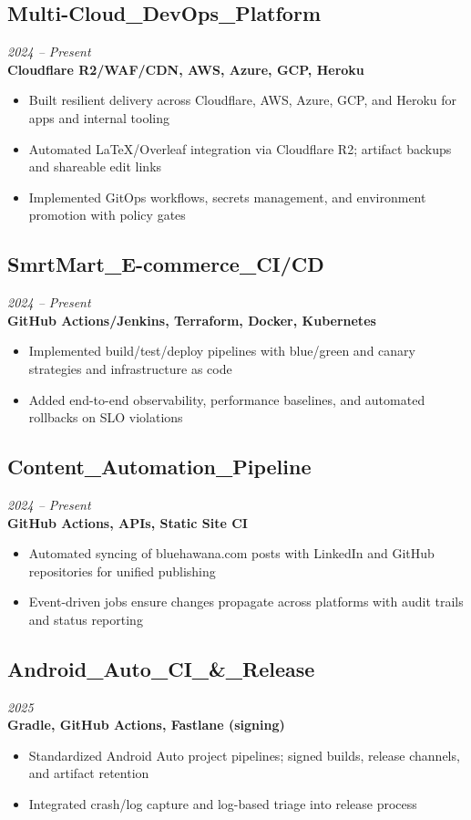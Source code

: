 \documentclass[11pt,a4paper]{article}
\begin{document}
\subsection{Multi-Cloud\_DevOps\_Platform}
\textit{2024 -- Present} \\
\textbf{Cloudflare R2/WAF/CDN, AWS, Azure, GCP, Heroku}
\begin{itemize}
\item Built resilient delivery across Cloudflare, AWS, Azure, GCP, and Heroku for apps and internal tooling
\item Automated LaTeX/Overleaf integration via Cloudflare R2; artifact backups and shareable edit links
\item Implemented GitOps workflows, secrets management, and environment promotion with policy gates
\end{itemize}

\subsection{SmrtMart\_E-commerce\_CI/CD}
\textit{2024 -- Present} \\
\textbf{GitHub Actions/Jenkins, Terraform, Docker, Kubernetes}
\begin{itemize}
\item Implemented build/test/deploy pipelines with blue/green and canary strategies and infrastructure as code
\item Added end-to-end observability, performance baselines, and automated rollbacks on SLO violations
\end{itemize}

\subsection{Content\_Automation\_Pipeline}
\textit{2024 -- Present} \\
\textbf{GitHub Actions, APIs, Static Site CI}
\begin{itemize}
\item Automated syncing of bluehawana.com posts with LinkedIn and GitHub repositories for unified publishing
\item Event-driven jobs ensure changes propagate across platforms with audit trails and status reporting
\end{itemize}

\subsection{Android\_Auto\_CI\_\&\_Release}
\textit{2025} \\
\textbf{Gradle, GitHub Actions, Fastlane (signing)}
\begin{itemize}
\item Standardized Android Auto project pipelines; signed builds, release channels, and artifact retention
\item Integrated crash/log capture and log-based triage into release process
\end{itemize}
\end{document}

